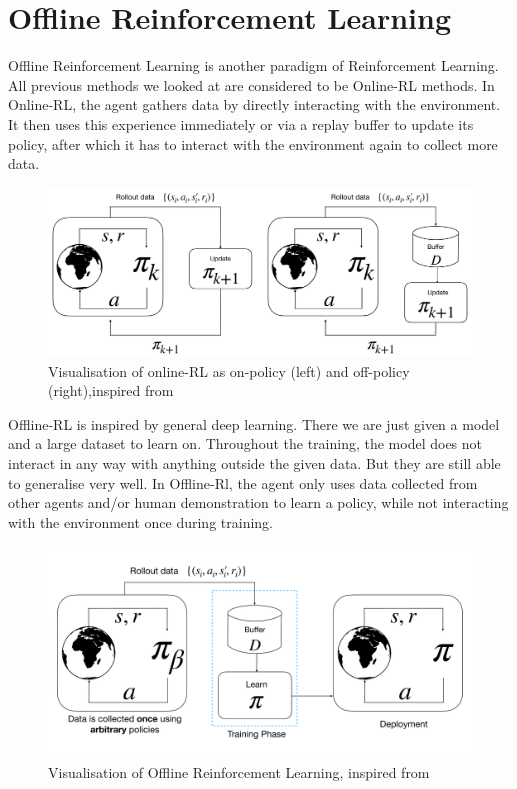 \section{Offline Reinforcement Learning}
Offline Reinforcement Learning is another paradigm of Reinforcement Learning. All previous 
methods we looked at are considered to be Online-RL methods. In Online-RL, the 
agent gathers data by directly interacting with the environment. It then uses this experience
immediately or via a replay buffer to update its policy, after which it has to interact with 
the environment again to collect more data.
\begin{figure}[H]
    \centering
    \includegraphics[width=0.8\linewidth]{images/off_vs_on_policy.pdf}
    \caption{Visualisation of online-RL as on-policy (left) and off-policy (right),inspired from 
    \cite{levine2020offlinereinforcementlearningtutorial}}
    \label{online_rl}
\end{figure}
Offline-RL is inspired by general deep learning. There we are just given a model and a 
large dataset to learn on. Throughout the training, the model does not interact in any way 
with anything outside the given data. But they are still able to generalise very well. In 
Offline-Rl, the agent only uses data collected from other agents and/or human 
demonstration to learn a policy, while not interacting with the environment once during 
training.
\vspace{-0.38cm}
\begin{figure} [H]
    \centering
    \includegraphics[width=0.8\linewidth]{images/offline_rl.pdf}
    \caption{Visualisation of Offline Reinforcement Learning, inspired from 
    \cite{levine2020offlinereinforcementlearningtutorial}}
    \label{offline_rl}
\end{figure}
